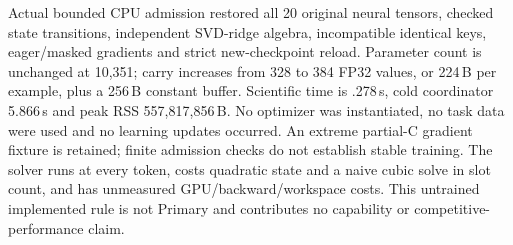 Actual bounded CPU admission restored all 20 original neural tensors, checked
state transitions, independent SVD-ridge algebra, incompatible identical keys,
eager/masked gradients and strict new-checkpoint reload. Parameter count is
unchanged at 10,351; carry increases from 328 to 384 FP32 values, or 224\,B per
example, plus a 256\,B constant buffer. Scientific time is .278\,s, cold coordinator
5.866\,s and peak RSS 557,817,856\,B. No optimizer was instantiated, no task data
were used and no learning updates occurred. An extreme partial-C gradient fixture
is retained; finite admission checks do not establish stable training. The solver
runs at every token, costs quadratic state and a naive cubic solve in slot count,
and has unmeasured GPU/backward/workspace costs. This untrained implemented rule
is not Primary and contributes no capability or competitive-performance claim.
